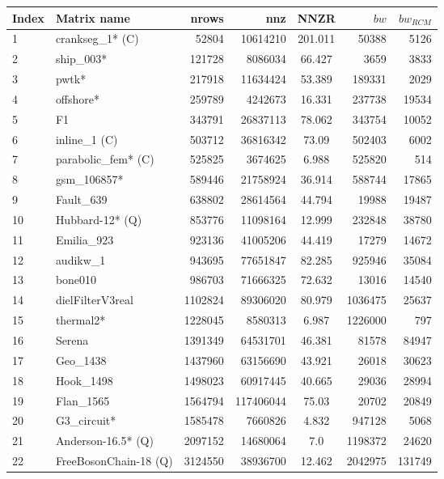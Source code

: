 \begin{tabular}{|l|l|r|r|S[round-mode=places,round-precision=2]|r|r|}
\toprule
{Index} & {Matrix name} &  {\acrshort{nrows}} & {\acrshort{nnz}} & {\acrshort{NNZR}}  & {$bw$} & {$bw_{RCM}$} \\
\midrule
{1}& {crankseg\_1* (C)}	& 52804	& 10614210	& 201.011	& 50388	& 5126	\\
{2}& {ship\_003*}	& 121728	& 8086034	& 66.427	& 3659	& 3833	\\
{3}& {pwtk*}	& 217918	& 11634424	& 53.389	& 189331	& 2029	\\
{4}& {offshore*}	& 259789	& 4242673	& 16.331	& 237738	& 19534	\\
{5}& {F1}	& 343791	& 26837113	& 78.062	& 343754	& 10052	\\
{6}& {inline\_1 (C)}	& 503712	& 36816342	& 73.09	& 502403	& 6002	\\
{7}& {parabolic\_fem* (C)}	& 525825	& 3674625	& 6.988	& 525820	& 514	\\
{8}& {gsm\_106857*}	& 589446	& 21758924	& 36.914	& 588744	& 17865	\\
{9}& {Fault\_639}	& 638802	& 28614564	& 44.794	& 19988	& 19487	\\
{10}& {Hubbard-12* (Q)}	& 853776	& 11098164	& 12.999	& 232848	& 38780	\\
{11}& {Emilia\_923}	& 923136	& 41005206	& 44.419	& 17279	& 14672	\\
{12}& {audikw\_1}	& 943695	& 77651847	& 82.285	& 925946	& 35084	\\
{13}& {bone010}	& 986703	& 71666325	& 72.632	& 13016	& 14540	\\
{14}& {dielFilterV3real}	& 1102824	& 89306020	& 80.979	& 1036475	& 25637	\\
{15}& {thermal2*}	& 1228045	& 8580313	& 6.987	& 1226000	& 797	\\
{16}& {Serena}	& 1391349	& 64531701	& 46.381	& 81578	& 84947	\\
{17}& {Geo\_1438}	& 1437960	& 63156690	& 43.921	& 26018	& 30623	\\
{18}& {Hook\_1498}	& 1498023	& 60917445	& 40.665	& 29036	& 28994	\\
{19}& {Flan\_1565}	& 1564794	& 117406044	& 75.03	& 20702	& 20849	\\
{20}& {G3\_circuit*}	& 1585478	& 7660826	& 4.832	& 947128	& 5068	\\
{21}& {Anderson-16.5* (Q)}	& 2097152	& 14680064	& 7.0	& 1198372	& 24620	\\
{22}& {FreeBosonChain-18 (Q)}	& 3124550	& 38936700	& 12.462	& 2042975	& 131749	\\

\end{tabular}
